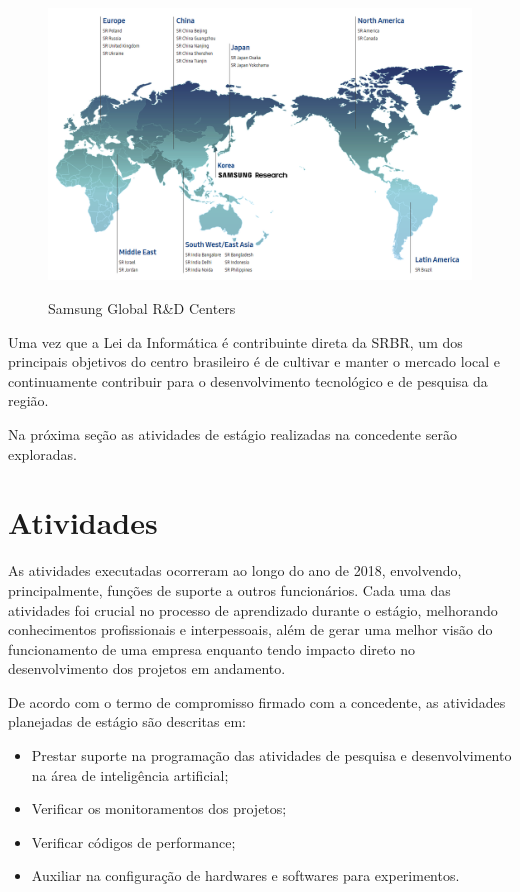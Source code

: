 \documentclass[
	12pt,				%
    oneside,			%
	a4paper,			%
	english,			%
	french,				%
	spanish,			%
	brazil				%
	]{abntex2}
\begin{document}
\begin{figure}[H] 
  \centering
  \includegraphics[width=400pt]{images/samsungresearch_centers.png}\\
  \caption[Samsung Global R&D Centers]{Samsung Global R\&D Centers}  \label{fig:samsung-research-network}
\end{figure}

Uma vez que a Lei da Informática é contribuinte direta da SRBR, um dos principais objetivos do centro brasileiro é de cultivar e manter o mercado local e continuamente contribuir para o desenvolvimento tecnológico e de pesquisa da região.

Na próxima seção as atividades de estágio realizadas na concedente serão exploradas.

\chapter{Atividades}

As atividades executadas ocorreram ao longo do ano de 2018, envolvendo, principalmente, funções de suporte a outros funcionários. Cada uma das atividades foi crucial no processo de aprendizado durante o estágio, melhorando conhecimentos profissionais e interpessoais, além de gerar uma melhor visão do funcionamento de uma empresa enquanto tendo impacto direto no desenvolvimento dos projetos em andamento.

De acordo com o termo de compromisso firmado com a concedente, as atividades planejadas de estágio são descritas em:
\begin{itemize}
    \item Prestar suporte na programação das atividades de pesquisa e desenvolvimento na área de inteligência artificial;
    \item Verificar os monitoramentos dos projetos;
    \item Verificar códigos de performance;
    \item Auxiliar na configuração de hardwares e softwares para experimentos.
\end{itemize}
\end{document}
